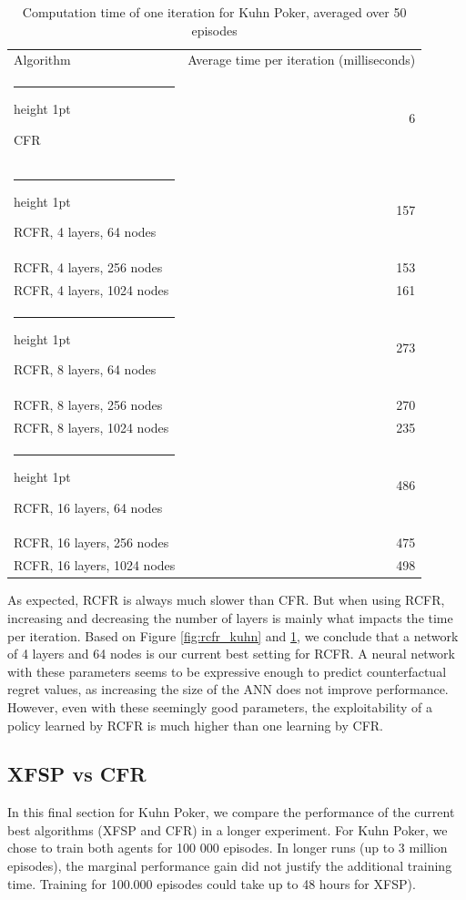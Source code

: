 \documentclass[10pt,a4paper]{article}
\makeatletter
\newcommand{\thickhline}{%
    \noalign {\ifnum 0=`}\fi \hrule height 1pt
    \futurelet \reserved@a \@xhline
}
\makeatother
\begin{document}
\begin{table}
\centering
\begin{tabular}{|l|r|}
\hline
Algorithm & Average time per iteration (milliseconds)\\
\thickhline
CFR & 6 \\
\thickhline
RCFR, 4 layers, 64 nodes& 157 \\
\hline
RCFR, 4 layers, 256 nodes & 153 \\
\hline
RCFR, 4 layers, 1024 nodes & 161 \\
\thickhline
RCFR, 8 layers, 64 nodes & 273 \\
\hline
RCFR, 8 layers, 256 nodes  & 270 \\
\hline
RCFR, 8 layers, 1024 nodes  & 235 \\
\thickhline
RCFR, 16 layers, 64 nodes & 486 \\
\hline
RCFR, 16 layers, 256 nodes & 475 \\
\hline
RCFR, 16 layers, 1024 nodes & 498 \\
\hline
\end{tabular}
\caption{Computation time of one iteration for Kuhn Poker, averaged over 50 episodes}
\label{tbl:kuhn_times}
\end{table}

As expected, RCFR is always much slower than CFR. But when using RCFR, increasing and decreasing the number of layers is mainly what impacts the time per iteration. Based on Figure \ref{fig:rcfr_kuhn} and \ref{tbl:kuhn_times}, we conclude that a network of 4 layers and 64 nodes is our current best setting for RCFR. A neural network with these parameters seems to be expressive enough to predict counterfactual regret values, as increasing the size of the ANN does not improve performance. However, even with these seemingly good parameters, the exploitability of a policy learned by RCFR is much higher than one learning by CFR. 

\subsection{XFSP vs CFR}
 In this final section for Kuhn Poker, we compare the performance of the current best algorithms (XFSP and CFR) in a longer experiment. For Kuhn Poker, we chose to train both agents for 100 000 episodes. In longer runs (up to 3 million episodes), the marginal performance gain did not justify the additional training time. Training for 100.000 episodes could take up to 48 hours for XFSP).
\end{document}
